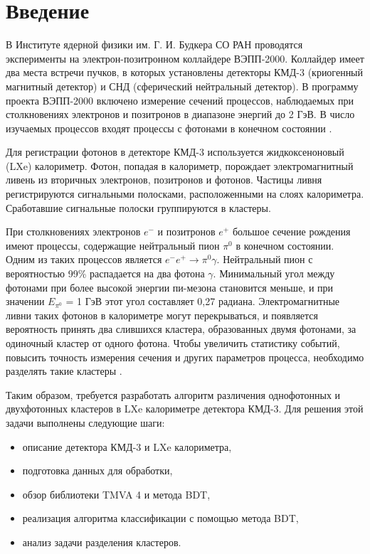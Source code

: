 \documentclass[14pt]{extarticle}
\begin{document}
	\setlength{\abovedisplayskip}{6pt}
	\setlength{\belowdisplayskip}{6pt}
	\setlength{\belowcaptionskip}{-15pt}
	\setcounter{page}{3}
	\thispagestyle{fancy}
\tableofcontents
\newpage
\section{Введение}
В Институте ядерной физики им. Г. И. Будкера СО РАН проводятся эксперименты на электрон-позитронном коллайдере ВЭПП-2000. Коллайдер имеет два места встречи пучков, в которых установлены детекторы КМД-3 (криогенный магнитный детектор) и СНД (сферический нейтральный детектор). В программу проекта ВЭПП-2000 включено измерение сечений процессов, наблюдаемых при столкновениях электронов и позитронов в диапазоне энергий до 2 ГэВ. В число изучаемых процессов входят процессы с фотонами в конечном состоянии \cite{shatunov}.

Для регистрации фотонов в детекторе КМД-3 используется жидкоксеноновый (LXe) калориметр. Фотон, попадая в калориметр, порождает электромагнитный ливень из вторичных электронов, позитронов и фотонов. Частицы ливня регистрируются сигнальными полосками, расположенными на слоях калориметра. Сработавшие сигнальные полоски группируются в кластеры.

При столкновениях электронов $e^-$ и позитронов $e^+$ большое сечение рождения имеют процессы, содержащие нейтральный пион $\pi^0$ в конечном состоянии. Одним из таких процессов является $e^- e^+ \to \pi^0 \gamma$. Нейтральный пион с вероятностью 99\% распадается на два фотона $\gamma$. Минимальный угол между фотонами при более высокой энергии пи-мезона становится меньше, и при значении $E_{\pi^0}$ = 1 ГэВ этот угол составляет 0,27 радиана. Электромагнитные ливни таких фотонов в калориметре могут перекрываться, и появляется вероятность принять два слившихся кластера, образованных двумя фотонами, за одиночный кластер от одного фотона. Чтобы увеличить статистику событий, повысить точность измерения сечения и других параметров процесса, необходимо разделять такие кластеры \cite{lakomov}.

Таким образом, требуется разработать алгоритм различения однофотонных и двухфотонных кластеров в LXe калориметре детектора КМД-3. Для решения этой задачи выполнены следующие шаги:
\begin{itemize}
	\item описание детектора КМД-3 и LXe калориметра,
	\item подготовка данных для обработки,
	\item обзор библиотеки TMVA 4 и метода BDT,
	\item реализация алгоритма классификации с помощью метода BDT,
	\item анализ задачи разделения кластеров.
\end{itemize}
\end{document}
